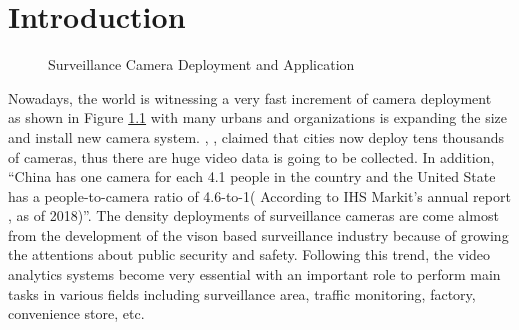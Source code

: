 \chapter{Introduction}  %
\begin{figure}
\centering
{}
\caption{Surveillance Camera Deployment and Application}
\label{fig:cctv}
\end{figure}
Nowadays, the world is witnessing a very fast increment of camera deployment ~\citep{ananthanarayanan2019demo} as shown in Figure \ref{fig:cctv} with many urbans and organizations is expanding the size and install new camera system. \cite{ref0}, \cite{ref1}, \cite{ref2} claimed that cities now deploy tens thousands of cameras, thus there are huge video data is going to be collected. In addition, “China has one camera for each 4.1 people in the country and the United State has a people-to-camera ratio of 4.6-to-1( According to IHS Markit’s annual report \cite{oliverreport}, as of 2018)”. The density deployments of surveillance cameras are come almost from the development of the vison based surveillance industry because of growing the attentions about public security and safety. Following this trend, the video analytics systems become very essential with an important role to perform main tasks in various fields including surveillance area, traffic monitoring, factory, convenience store, etc.

